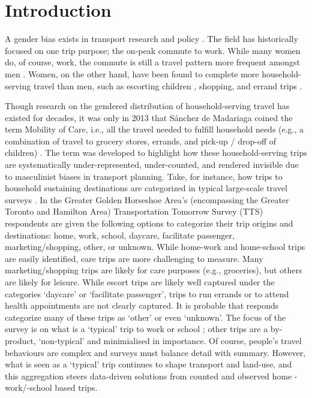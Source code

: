 \documentclass[
  authoryear,
  preprint,
  3p]{elsarticle}
\begin{document}
\hypertarget{introduction}{%
\section{Introduction}\label{introduction}}

A gender bias exists in transport research and policy
\citep{sanchezdemadariagaMobilityCareIntroducing2013, lawWomenTransportNew1999, siemiatyckiGenderedProductionInfrastructure2020}.
The field has historically focused on one trip purpose; the on-peak
commute to work. While many women do, of course, work, the commute is
still a travel pattern more frequent amongst men
\citep{sanchezdemadariagaMobilityCareIntroducing2013}. Women, on the
other hand, have been found to complete more household-serving travel
than men, such as escorting children
\citep{craigGenderMobilityParental2019, taylorWhatExplainsGender2015, hanTaskAllocationGender2019, mcdonaldExploratoryAnalysisChildren2006},
shopping, and errand trips
\citep{taylorWhatExplainsGender2015, rootWomenTravelIdea2000, sweetGenderDifferencesRole2016}.

Though research on the gendered distribution of household-serving travel
has existed for decades, it was only in 2013 that Sánchez de Madariaga
coined the term Mobility of Care, i.e., all the travel needed to fulfill
household needs (e.g., a combination of travel to grocery stores,
errands, and pick-up / drop-off of children)
\citep{sanchezdemadariagaMobilityCareIntroducing2013}. The term was
developed to highlight how these household-serving trips are
systematically under-represented, under-counted, and rendered invisible
due to masculinist biases in transport planning. Take, for instance, how
trips to household sustaining destinations are categorized in typical
large-scale travel surveys
\citep{sanchezdemadariagaMobilityCareIntroducing2013}. In the Greater
Golden Horseshoe Area's (encompassing the Greater Toronto and Hamilton
Area) Transportation Tomorrow Survey (TTS)
\citep{transportationtomorrowsurvey2018} respondents are given the
following options to categorize their trip origins and destinations:
home, work, school, daycare, facilitate passenger, marketing/shopping,
other, or unknown. While home-work and home-school trips are easily
identified, care trips are more challenging to measure. Many
marketing/shopping trips are likely for care purposes (e.g., groceries),
but others are likely for leisure. While escort trips are likely well
captured under the categories `daycare' or `facilitate passenger', trips
to run errands or to attend health appointments are not clearly
captured. It is probable that responds categorize many of these trips as
`other' or even `unknown'. The focus of the survey is on what is a
`typical' trip to work or school
\citep{transportationtomorrowsurvey2018}; other trips are a by-product,
`non-typical' and minimialised in importance. Of course, people's travel
behaviours are complex and surveys must balance detail with summary.
However, what is seen as a `typical' trip continues to shape transport
and land-use, and this aggregation steers data-driven solutions from
counted and observed home -work/-school based trips.
\end{document}
